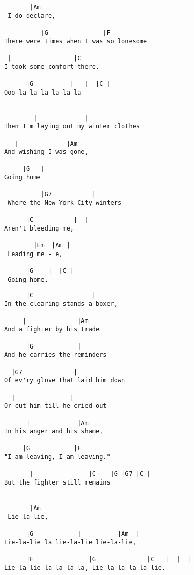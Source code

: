 \documentclass[leqno]{memoir}
\begin{document}
\newpage
\begin{verbatim}
       |Am
 I do declare,

          |G               |F
There were times when I was so lonesome

 |                 |C
I took some comfort there.

      |G          |   |  |C |
Ooo-la-la la-la la-la


        |             | 
Then I'm laying out my winter clothes

   |             |Am 
And wishing I was gone,

     |G   |
Going home

          |G7           |
 Where the New York City winters

      |C           |  |
Aren't bleeding me,

        |Em  |Am | 
 Leading me - e,

      |G    |  |C |
 Going home.
\end{verbatim}
\newpage
\begin{verbatim}
      |C                |
In the clearing stands a boxer,

     |              |Am
And a fighter by his trade

      |G            |
And he carries the reminders

  |G7              | 
Of ev'ry glove that laid him down

  |               | 
Or cut him till he cried out

      |             |Am
In his anger and his shame,
 
     |G            |F
"I am leaving, I am leaving."

       |               |C    |G |G7 |C |
But the fighter still remains


       |Am
 Lie-la-lie, 

      |G            |          |Am  |
Lie-la-lie la lie-la-lie lie-la-lie, 

      |F               |G              |C   |  |  | 
Lie-la-lie la la la la, Lie la la la la lie. 
\end{verbatim}
\newpage
\end{document}
